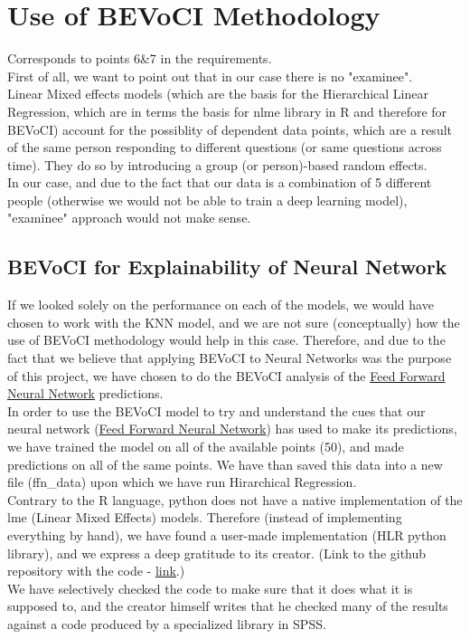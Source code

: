 \documentclass[11pt, oneside]{article}   	%
\begin{document}
\section{Use of BEVoCI Methodology}
Corresponds to points 6\&7 in the requirements.\\

First of all, we want to point out that in our case there is no "examinee".\\
Linear Mixed effects models (which are the basis for the Hierarchical Linear Regression, which are in terms the basis for nlme library in R and therefore for BEVoCI) account for the possiblity of dependent data points, which are a result of the same person responding to different questions (or same questions across time). They do so by introducing a group (or person)-based random effects.\\

In our case, and due to the fact that our data is a combination of 5 different people (otherwise we would not be able to train a deep learning model), "examinee" approach would not make sense.\\
\subsection{BEVoCI for Explainability of Neural Network}\label{sec:ffn_hlr}
If we looked solely on the performance on each of the models, we would have chosen to work with the KNN model, and we are not sure (conceptually) how the use of BEVoCI methodology would help in this case. Therefore, and due to the fact that we believe that applying BEVoCI to Neural Networks was the purpose of this project, we have chosen to do the BEVoCI analysis of the \href{sec:ffn}{Feed Forward Neural Network} predictions.\\

In order to use the BEVoCI model to try and understand the cues that our neural network (\href{sec:ffn}{Feed Forward Neural Network}) has used to make its predictions, we have trained the model on all of the available points (50), and made predictions on all of the same points. We have than saved this data into a new file (ffn\_data) upon which we have run Hirarchical Regression.\\

Contrary to the R language, python does not have a native implementation of the lme (Linear Mixed Effects) models.
Therefore (instead of implementing everything by hand), we have found a user-made implementation (HLR python library), and we express a deep gratitude to its creator. (Link to the github repository with the code - \href{https://github.com/teanijarv/HLR}{link}.)\\
We have selectively checked the code to make sure that it does what it is supposed to, and the creator himself writes that he checked many of the results against a code produced by a specialized library in SPSS.
\end{document}
